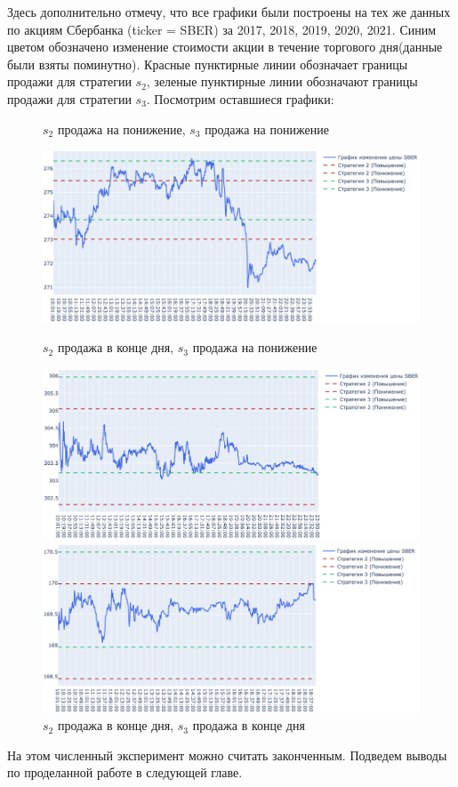 Здесь дополнительно отмечу, что все графики были построены на тех же данных по акциям Сбербанка (ticker = SBER) за 2017, 2018, 2019, 2020, 2021. Синим цветом обозначено изменение стоимости акции в течение торгового дня(данные были взяты поминутно). Красные пунктирные линии обозначает границы продажи для стратегии $s_2$, зеленые пунктирные линии обозначают границы продажи для стратегии $s_3$. Посмотрим оставшиеся графики:

\begin{center}
    \begin{figure}[h]
        \centering
        \caption{$s_2$ продажа на понижение, $s_3$ продажа на понижение}
        \includegraphics[keepaspectratio=true,scale=0.35]{images/chapter3/downdown.png}
        
        \caption{$s_2$ продажа в конце дня, $s_3$ продажа на понижение}
        \includegraphics[keepaspectratio=true,scale=0.35]{images/chapter3/zerodown.png}
        
        \caption{$s_2$ продажа в конце дня, $s_3$ продажа в конце дня}
        \includegraphics[keepaspectratio=true,scale=0.35]{images/chapter3/zerozero.png}
    \end{figure}
\end{center}


На этом численный эксперимент можно считать законченным. Подведем выводы по проделанной работе в следующей главе.


